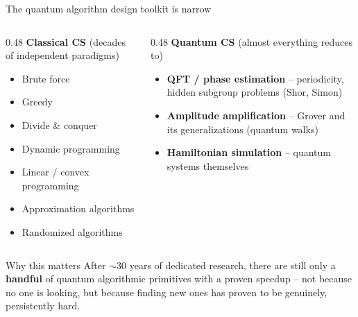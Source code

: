 \documentclass[aspectratio=169,11pt]{beamer}
\begin{document}
\begin{frame}{The quantum algorithm design toolkit is narrow}
  \begin{columns}
    \begin{column}{0.48\textwidth}
      \textbf{Classical CS} (decades of independent paradigms)
      \begin{itemize}
        \small
        \item Brute force
        \item Greedy
        \item Divide \& conquer
        \item Dynamic programming
        \item Linear / convex programming
        \item Approximation algorithms
        \item Randomized algorithms
      \end{itemize}
    \end{column}
    \begin{column}{0.48\textwidth}
      \textbf{Quantum CS} (almost everything reduces to)
      \begin{itemize}
        \item \textbf{QFT / phase estimation} -- periodicity, hidden
              subgroup problems (Shor, Simon)
        \item \textbf{Amplitude amplification} -- Grover and its
              generalizations (quantum walks)
        \item \textbf{Hamiltonian simulation} -- quantum systems
              themselves
      \end{itemize}
    \end{column}
  \end{columns}
  \begin{alertblock}{Why this matters}
    After $\sim$30 years of dedicated research, there are still only a
    \textbf{handful} of quantum algorithmic primitives with a proven
    speedup -- not because no one is looking, but because finding new
    ones has proven to be genuinely, persistently hard.
  \end{alertblock}
\end{frame}
\end{document}
